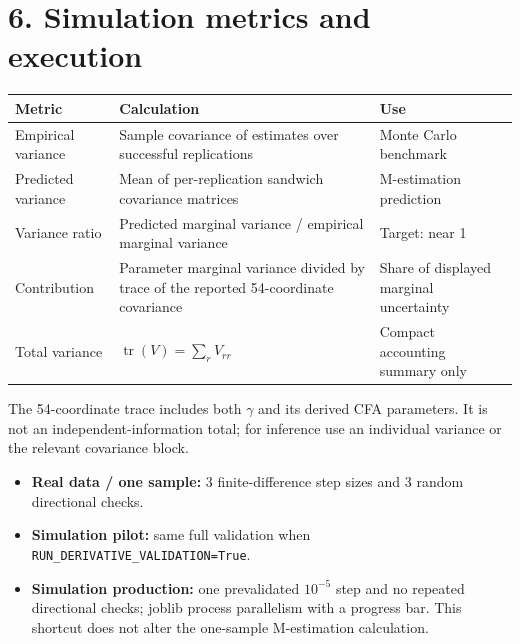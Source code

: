 \documentclass[10pt]{article}
\begin{document}
\section*{6. Simulation metrics and execution}
\begin{tabularx}{\linewidth}{@{}l Y Y@{}}
\toprule
Metric & Calculation & Use \\
\midrule
Empirical variance & Sample covariance of estimates over successful replications & Monte Carlo benchmark \\
Predicted variance & Mean of per-replication sandwich covariance matrices & M-estimation prediction \\
Variance ratio & Predicted marginal variance / empirical marginal variance & Target: near 1 \\
Contribution & Parameter marginal variance divided by trace of the reported 54-coordinate covariance & Share of displayed marginal uncertainty \\
Total variance & $\operatorname{tr}(V)=\sum_rV_{rr}$ & Compact accounting summary only \\
\bottomrule
\end{tabularx}

The 54-coordinate trace includes both $\gamma$ and its derived CFA parameters. It is not an independent-information total; for inference use an individual variance or the relevant covariance block.

\begin{itemize}
\item \textbf{Real data / one sample:} 3 finite-difference step sizes and 3 random directional checks.
\item \textbf{Simulation pilot:} same full validation when \texttt{RUN\_DERIVATIVE\_VALIDATION=True}.
\item \textbf{Simulation production:} one prevalidated $10^{-5}$ step and no repeated directional checks; joblib process parallelism with a progress bar. This shortcut does not alter the one-sample M-estimation calculation.
\end{itemize}
\end{document}
